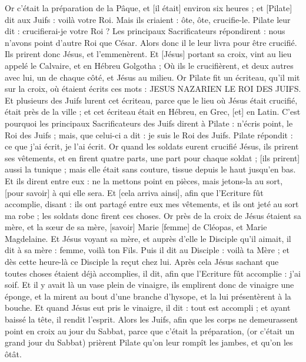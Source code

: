 \begin{multicols}{2}
Or c'était la préparation de la Pâque, et [il était] environ six heures ; et [Pilate] dit aux Juifs : voilà votre Roi.
Mais ils criaient : ôte, ôte, crucifie-le. Pilate leur dit : crucifierai-je votre Roi ? Les principaux Sacrificateurs répondirent : nous n'avons point d'autre Roi que César.
Alors donc il le leur livra pour être crucifié. Ils prirent donc Jésus, et l'emmenèrent.
Et [Jésus] portant sa croix, vint au lieu appelé le Calvaire, et en Hébreu Golgotha ;
Où ils le crucifièrent, et deux autres avec lui, un de chaque côté, et Jésus au milieu.
Or Pilate fit un écriteau, qu'il mit sur la croix, où étaient écrits ces mots : JESUS NAZARIEN LE ROI DES JUIFS.
Et plusieurs des Juifs lurent cet écriteau, parce que le lieu où Jésus était crucifié, était près de la ville ; et cet écriteau était en Hébreu, en Grec, [et] en Latin.
C'est pourquoi les principaux Sacrificateurs des Juifs dirent à Pilate : n'écris point, le Roi des Juifs ; mais, que celui-ci a dit : je suis le Roi des Juifs.
Pilate répondit : ce que j'ai écrit, je l'ai écrit.
Or quand les soldats eurent crucifié Jésus, ils prirent ses vêtements, et en firent quatre parts, une part pour chaque soldat ; [ils prirent] aussi la tunique ; mais elle était sans couture, tissue depuis le haut jusqu'en bas.
Et ils dirent entre eux : ne la mettons point en pièces, mais jetons-la au sort, [pour savoir] à qui elle sera. Et [cela arriva ainsi], afin que l'Ecriture fût accomplie, disant : ils ont partagé entre eux mes vêtements, et ils ont jeté au sort ma robe ; les soldats donc firent ces choses.
Or près de la croix de Jésus étaient sa mère, et la sœur de sa mère, [savoir] Marie [femme] de Cléopas, et Marie Magdelaine.
Et Jésus voyant sa mère, et auprès d'elle le Disciple qu'il aimait, il dit à sa mère : femme, voilà ton Fils.
Puis il dit au Disciple : voilà ta Mère ; et dès cette heure-là ce Disciple la reçut chez lui.
Après cela Jésus sachant que toutes choses étaient déjà accomplies, il dit, afin que l'Ecriture fût accomplie : j'ai soif.
Et il y avait là un vase plein de vinaigre, ils emplirent donc de vinaigre une éponge, et la mirent au bout d'une branche d'hysope, et la lui présentèrent à la bouche.
Et quand Jésus eut pris le vinaigre, il dit : tout est accompli ; et ayant baissé la tête, il rendit l'esprit.
Alors les Juifs, afin que les corps ne demeurassent point en croix au jour du Sabbat, parce que c'était la préparation, (or c'était un grand jour du Sabbat) prièrent Pilate qu'on leur rompît les jambes, et qu'on les ôtât.

\end{multicols}
